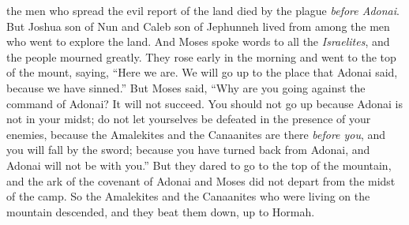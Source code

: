\begin{biblechapter}
\verse the men who spread the evil report of the land died by the plague \textit{before Adonai}.
\verse But Joshua son of Nun and Caleb son of Jephunneh lived from among the men who went to explore the land.
\verse And Moses spoke words to all the \textit{Israelites}, and the people mourned greatly.
\verse They rose early in the morning and went to the top of the mount, saying, “Here we are. We will go up to the place that Adonai said, because we have sinned.”
\verse But Moses said, “Why are you going against the command of Adonai? It will not succeed.
\verse You should not go up because Adonai is not in your midst; do not let yourselves be defeated in the presence of your enemies,
\verse because the Amalekites and the Canaanites are there \textit{before you}, and you will fall by the sword; because you have turned back from Adonai, and Adonai will not be with you.”
\verse But they dared to go to the top of the mountain, and the ark of the covenant of Adonai and Moses did not depart from the midst of the camp.
\verse So the Amalekites and the Canaanites who were living on the mountain descended, and they beat them down, up to Hormah.
\end{biblechapter}

